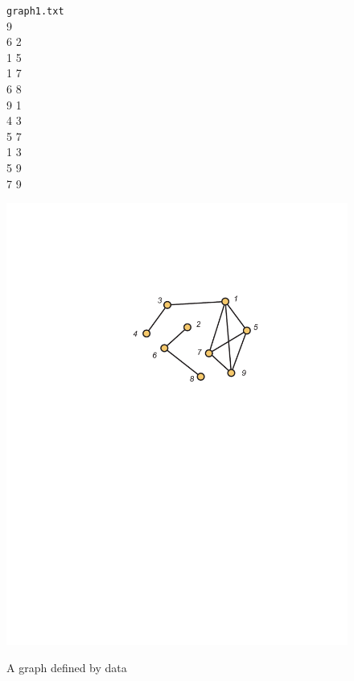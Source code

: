 \hspace{.5in}
\begin{figure}
\begin{minipage}{1.5in}
\texttt{graph1.txt}\\
9\\
6 2\\
1 5\\
1 7\\
6 8\\
9 1\\
4 3\\
5 7\\
1 3\\
5 9\\
7 9
\end{minipage}
\begin{minipage}{3in}
\includegraphics[viewport=223 457 460 629, scale=.6]{intro-figs/3012-fig15}\\
\caption{A graph defined by data}
\label{fig:graphdata}
\end{minipage}
\end{figure}

